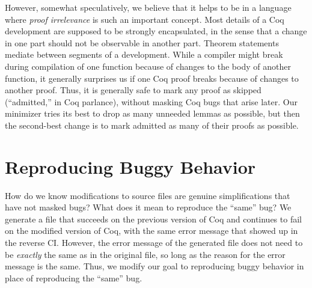 \documentclass[a4paper,USenglish,cleveref,autoref,thm-restate]{lipics-v2021}
\begin{document}
However, somewhat speculatively, we believe that it helps to be in a language where \emph{proof irrelevance} is such an important concept.
Most details of a Coq development are supposed to be strongly encapsulated, in the sense that a change in one part should not be observable in another part.
Theorem statements mediate between segments of a development.
While a compiler might break during compilation of one function because of changes to the body of another function, it generally surprises us if one Coq proof breaks because of changes to another proof.
Thus, it is generally safe to mark any proof as skipped (``admitted,'' in Coq parlance), without masking Coq bugs that arise later.
Our minimizer tries its best to drop as many unneeded lemmas as possible, but then the second-best change is to mark admitted as many of their proofs as possible.


\section{Reproducing Buggy Behavior}\label{sec:error-messages}

How do we know modifications to source files are genuine simplifications that have not masked bugs?
What does it mean to reproduce the ``same'' bug?
We generate a file that succeeds on the previous version of Coq and continues to fail on the modified version of Coq, with the same error message that showed up in the reverse CI.
However, the error message of the generated file does not need to be \emph{exactly} the same as in the original file, so long as the reason for the error message is the same.
Thus, we modify our goal to reproducing buggy behavior in place of reproducing the ``same'' bug.
\end{document}
